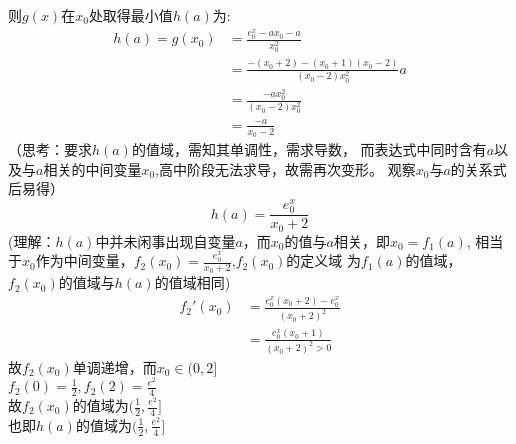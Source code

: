 \documentclass[UTF8]{ctexart}
\begin{document}
则$g(x)$在$x_0$处取得最小值$h(a)$为:
\[\begin{aligned}
        h(a)=g(x_0)&=\frac{e^x_0-ax_0-a}{x_0^2} \\
        &=\frac{-(x_0+2)-(x_0+1)(x_0-2)}{(x_0-2)x_0^2}a\\ 
        &=\frac{-ax_0^2}{(x_0-2)x_0^2}  \\
        &=\frac{-a}{x_0-2}  
\end{aligned}\]
（思考：要求$h(a)$的值域，需知其单调性，需求导数，
而表达式中同时含有$a$以及与$a$相关的中间变量$x_0$,高中阶段无法求导，故需再次变形。
观察$x_0$与$a$的关系式后易得）
\[h(a)=\frac{e^x_0}{x_0+2}\]
(理解：$h(a)$中并未闲事出现自变量$a$，而$x_0$的值与$a$相关，即$x_0=f_1(a)$,
相当于$x_0$作为中间变量，$f_2(x_0)=\frac{e^x_0}{x_0+2}$,$f_2(x_0)$的定义域
为$f_1(a)$的值域，$f_2(x_0)$的值域与$h(a)$的值域相同)
\[\begin{aligned}
    f_2'(x_0)&=\frac{e^x_0(x_0+2)-e^x_0}{(x_0+2)^2}\\
    &=\frac{e^x_0(x_0+1)}{(x_0+2)^2>0}
    \end{aligned} \]
故$f_2(x_0)$单调递增，而$x_0 \in (0,2]$\\
$f_2(0)=\frac{1}{2},f_2(2)=\frac{e^2}{4}$\\
故$f_2(x_0)$的值域为$(\frac{1}{2},\frac{e^2}{4}]$\\
也即$h(a)$的值域为$(\frac{1}{2},\frac{e^2}{4}]$
\end{document}
